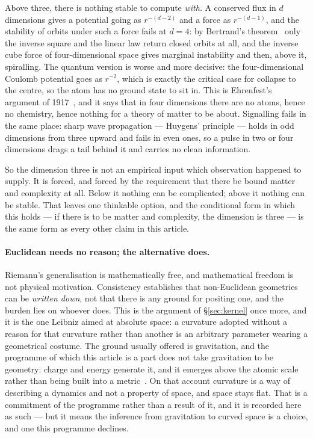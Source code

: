 \documentclass[11pt]{article}
\begin{document}
Above three, there is nothing stable to compute \emph{with}. A conserved flux in $d$ dimensions
gives a potential going as $r^{-(d-2)}$ and a force as $r^{-(d-1)}$, and the stability of orbits
under such a force fails at $d = 4$: by Bertrand's theorem~\cite{bertrand} only the inverse square and the linear
law return closed orbits at all, and the inverse cube force of four-dimensional space gives
marginal instability and then, above it, spiralling. The quantum version is worse and more decisive:
the four-dimensional Coulomb potential goes as $r^{-2}$, which is exactly the critical case for
collapse to the centre, so the atom has no ground state to sit in. This is Ehrenfest's argument of
1917~\cite{ehrenfest}, and it says that in four dimensions there are no atoms, hence no chemistry, hence nothing for
a theory of matter to be about. Signalling fails in the same place: sharp wave propagation ---
Huygens' principle --- holds in odd dimensions from three upward and fails in even ones, so a pulse
in two or four dimensions drags a tail behind it and carries no clean information.

So the dimension three is not an empirical input which observation happened to supply. It is forced,
and forced by the requirement that there be bound matter and complexity at all. Below it nothing can
be complicated; above it nothing can be stable. That leaves one thinkable option, and the
conditional form in which this holds --- if there is to be matter and complexity, the dimension is
three --- is the same form as every other claim in this article.

\paragraph{Euclidean needs no reason; the alternative does.} Riemann's generalisation is
mathematically free, and mathematical freedom is not physical motivation. Consistency establishes
that non-Euclidean geometries can be \emph{written down}, not that there is any ground for
positing one, and the burden lies on whoever does. This is the argument of
\S\ref{sec:kernel} once more, and it is the one Leibniz aimed at absolute space: a curvature
adopted without a reason for that curvature rather than another is an arbitrary parameter wearing
a geometrical costume. The ground usually offered is gravitation, and
the programme of which this article is a part does not take gravitation to be geometry: charge and
energy generate it, and it emerges above the atomic scale rather than being built into a
metric~\cite{gravity}. On
that account curvature is a way of describing a dynamics and not a property of space, and space
stays flat. That is a commitment of the programme rather than a result of it, and it is recorded
here as such --- but it means the inference from gravitation to curved space is a choice, and one
this programme declines.
\end{document}
